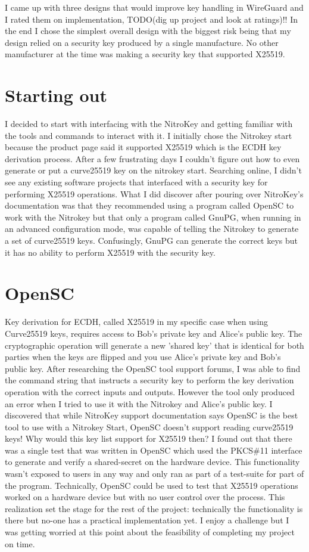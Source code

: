 \documentclass [11pt, proquest] {uwthesis}[2020/02/24]
\begin{document}
I came up with three designs that would improve key handling in WireGuard and I rated them on implementation, TODO(dig up project and look at ratings)!! In the end I chose the simplest overall design with the biggest risk being that my design relied on a security key produced by a single manufacture. No other manufacturer at the time was making a security key that supported X25519.

\section{Starting out}

I decided to start with interfacing with the NitroKey and getting familiar with the tools and commands to interact with it. I initially chose the Nitrokey start because the product page said it supported X25519\cite{noauthor_nitrokey_nodate} which is the ECDH key derivation process. After a few frustrating days I couldn't figure out how to even generate or put a curve25519 key on the nitrokey start. Searching online, I didn't see any existing software projects that interfaced with a security key for performing X25519 operations. What I did discover after pouring over NitroKey's documentation was that they recommended using a program called OpenSC to work with the Nitrokey but that only a program called GnuPG, when running in an advanced configuration mode, was capable of telling the Nitrokey to generate a set of curve25519 keys. Confusingly, GnuPG can generate the correct keys but it has no ability to perform X25519 with the security key.

\section {OpenSC}
Key derivation for ECDH, called X25519 in my specific case when using Curve25519 keys, requires access to Bob's private key and Alice's public key. The cryptographic operation will generate a new 'shared key' that is identical for both parties when the keys are flipped and you use Alice's private key and Bob's public key. 
After researching the OpenSC tool support forums, I was able to find the command string that instructs a  security key to perform the key derivation operation with the correct inputs and outputs. However the tool only produced an error when I tried to use it with the Nitrokey and Alice's public key. I discovered that while NitroKey support documentation says OpenSC is the best tool to use with a Nitrokey Start, OpenSC doesn't support reading curve25519 keys! Why would this key list support for X25519 then? I found out that there was a single test that was written in OpenSC which used the PKCS\#11 interface to generate and verify a shared-secret on the hardware device. This functionality wasn't exposed to users in any way and only ran as part of a test-suite for part of the program. Technically, OpenSC could be used to test that X25519 operations worked on a hardware device but with no user control over the process. This realization set the stage for the rest of the project: technically the functionality is there but no-one has a practical implementation yet. I enjoy a challenge but I was getting worried at this point about the feasibility of completing my project on time.
\end{document}
